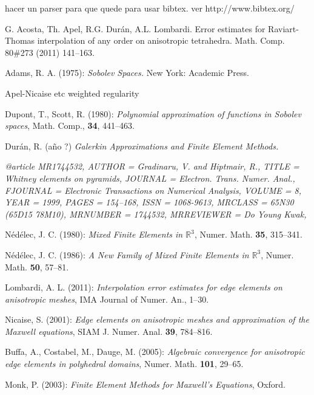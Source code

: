 \begin{thebibliography}{9}
 {\color{red} hacer un parser para que quede para usar bibtex.
ver http://www.bibtex.org/}

 G. Acosta, Th. Apel, R.G. Dur\'an, A.L. Lombardi. Error estimates for Raviart-Thomas interpolation of
any order on anisotropic tetrahedra. Math. Comp. 80\#273 (2011) 141--163. 

Adams, R. A. (1975): \emph{Sobolev Spaces.} New York: Academic Press.

Apel-Nicaise etc weighted regularity 

Dupont, T., Scott, R. (1980): \emph{Polynomial approximation of functions in Sobolev spaces},
Math. Comp., \textbf{34}, 441--463.

Dur\'an, R. (a\~no ?) \emph{Galerkin Approximations and Finite Element Methods.}

\emph{
@article {MR1744532,
    AUTHOR = {Gradinaru, V. and Hiptmair, R.},
     TITLE = {Whitney elements on pyramids},
   JOURNAL = {Electron. Trans. Numer. Anal.},
  FJOURNAL = {Electronic Transactions on Numerical Analysis},
    VOLUME = {8},
      YEAR = {1999},
     PAGES = {154--168},
      ISSN = {1068-9613},
   MRCLASS = {65N30 (65D15 78M10)},
  MRNUMBER = {1744532},
MRREVIEWER = {Do Young Kwak},
}}


N\'ed\'elec, J. C. (1980): \emph{Mixed Finite Elements in $\mathbb{R}^3$}, Numer. Math. \textbf{35},
315--341.

N\'ed\'elec, J. C. (1986): \emph{A New Family of Mixed Finite Elements in $\mathbb{R}^3$}, Numer. Math. 
\textbf{50}, 57--81.

Lombardi, A. L. (2011): \emph{Interpolation error estimates for edge elements on anisotropic meshes}, 
IMA Journal of Numer. An., 1--30.

Nicaise, S. (2001): \emph{Edge elements on anisotropic meshes and approximation of the Maxwell equations},
SIAM J. Numer. Anal. \textbf{39}, 784--816.

Buffa, A., Costabel, M., Dauge, M. (2005): \emph{Algebraic convergence for anisotro\-pic edge elements
in polyhedral domains}, Numer. Math. \textbf{101}, 29--65.

Monk, P. (2003): \emph{Finite Element Methods for Maxwell's Equations}, Oxford.
\end{thebibliography}
